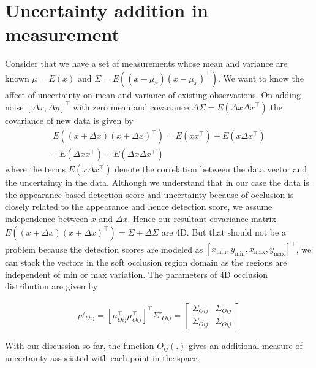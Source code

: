 \documentclass[10pt,twocolumn,letterpaper]{article}
\newcommand{\Beizer}{B\'eizer }
\begin{document}
  \section{Uncertainty addition in measurement}
  Consider that we have a set of measurements whose mean and variance are known $\mu = E(x)$ and $\Sigma = E ((x - \mu_x)(x - \mu_x)^\top)$. We want to know the
  affect of uncertainty on mean and variance of existing observations. On adding
  noise $[\Delta x, \Delta y]^\top$ with zero mean and covariance $\Delta
  \Sigma = E(\Delta x \Delta x^\top)$ the covariance of new data is given by
  \begin{multline}
    E((x + \Delta x)(x+\Delta x)^\top) = E(xx^\top) + E(x \Delta x^\top) \\
    + E(\Delta x x^\top) + E(\Delta x \Delta x^\top)
  \end{multline}
  where the terms $E(x \Delta x^\top)$ denote the correlation between the data
  vector and the uncertainty in the data. Although we understand that in our case
  the data is the appearance based detection score and uncertainty because of
  occlusion is closely related to the appearance and hence detection score, we
  assume independence between $x$ and $\Delta x$. Hence our resultant covariance
  matrix $ E((x + \Delta x)(x+\Delta x)^\top) = \Sigma + \Delta \Sigma$
  are 4D. But that should not be a problem because the detection scores are
  modeled as $[x_{\text{min}}, y_{\text{min}}, x_{\text{max}},
  y_{\text{max}}]^\top$, we can stack the vectors in the soft occlusion region
  domain as the regions are independent of min or max variation. The parameters
  of 4D occlusion distribution are given by

  \begin{align}
    \mu'_{Oij} = [\mu_{Oij}^\top \mu_{Oij}^\top]^\top
    \Sigma'_{Oij} = \begin{bmatrix}
      \Sigma_{Oij} & \Sigma_{Oij} \\
  \Sigma_{Oij} & \Sigma_{Oij}
    \end{bmatrix}
  \end{align}

  With our
  discussion so far, the function $O_{ij}(.)$ gives an additional measure of
  uncertainty associated with each point in the space.

\end{document}
